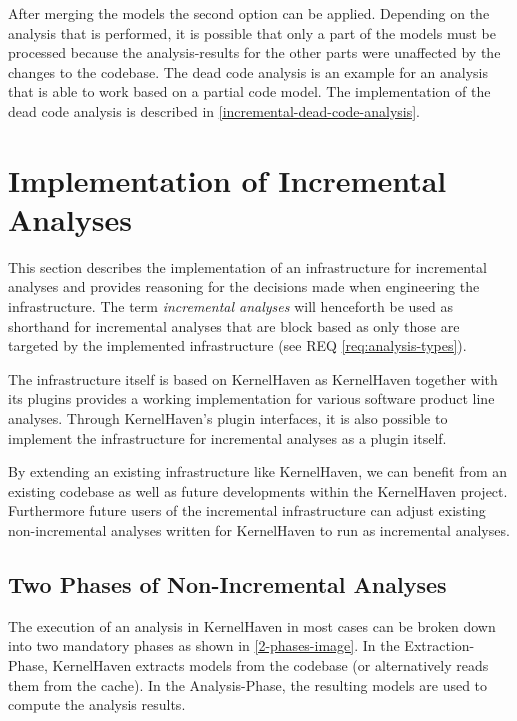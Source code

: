 \documentclass[a4paper]{article}
\begin{document}
After merging the models the second option can be applied. Depending on the analysis that is performed, it is possible that only a part of the models must be processed because the analysis-results for the other parts were unaffected by the changes to the codebase. The dead code analysis is an example for an analysis that is able to work based on a partial code model. The implementation of the dead code analysis is described in \autoref{incremental-dead-code-analysis}.


\clearpage


\section{Implementation of Incremental Analyses}\label{implementation}

This section describes the implementation of an infrastructure for incremental analyses and provides reasoning for the decisions made when engineering the infrastructure. The term \emph{incremental analyses} will henceforth be used as shorthand for incremental analyses that are block based as only those are targeted by the implemented infrastructure (see REQ \ref{req:analysis-types}).

The infrastructure itself is based on KernelHaven \cite{KroeherEl-SharkawySchmid18} as KernelHaven together with its plugins provides a working implementation for various software product line analyses. Through KernelHaven's plugin interfaces, it is also possible to implement the infrastructure for incremental analyses as a plugin itself.

By extending an existing infrastructure like KernelHaven, we can benefit from an existing codebase as well as future developments within the KernelHaven project. Furthermore future users of the incremental infrastructure can adjust existing non-incremental analyses written for KernelHaven to run as incremental analyses.

\subsection{Two Phases of Non-Incremental Analyses}\label{2-phases}

The execution of an analysis in KernelHaven in most cases can be broken down into two mandatory phases as shown in \autoref{2-phases-image}. In the Extraction-Phase, KernelHaven extracts models from the codebase  (or alternatively reads them from the cache). In the Analysis-Phase, the resulting models are used to compute the analysis results.
\end{document}
